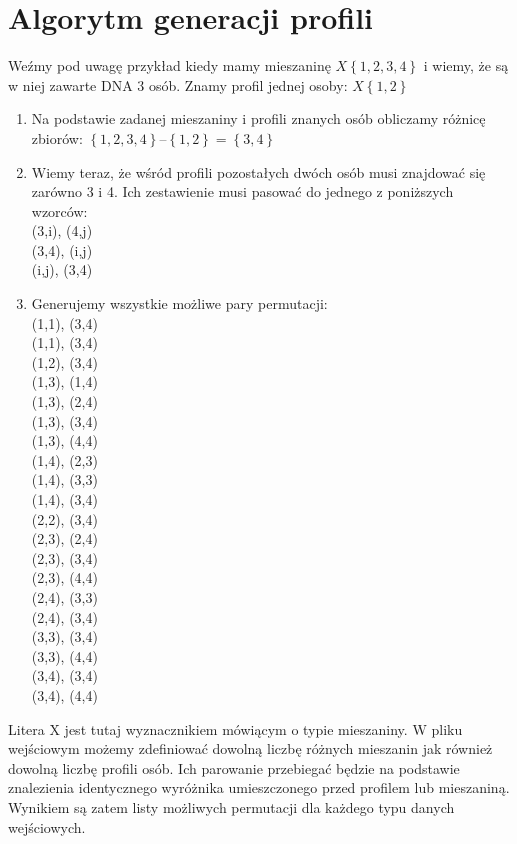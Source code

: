 \documentclass[11pt,a4paper]{article}
\begin{document}
\section{Algorytm generacji profili}
Weźmy pod uwagę przykład kiedy mamy mieszaninę $X\left\{1,2,3,4\right\}$ i wiemy, że są w niej zawarte DNA 3 osób. Znamy profil jednej osoby: $X\left\{1,2\right\}$
\begin{enumerate}
\item Na podstawie zadanej mieszaniny i profili znanych osób obliczamy różnicę zbiorów:
$\left\{1,2,3,4\right\} – \left\{1,2\right\} = \left\{3,4\right\}$
\item Wiemy teraz, że wśród profili pozostałych dwóch osób musi znajdować się zarówno 3 i 4. Ich zestawienie musi pasować do jednego z poniższych wzorców: \\
(3,i), (4,j) \\
(3,4), (i,j) \\
(i,j), (3,4) \\

\item Generujemy wszystkie możliwe pary permutacji: \\
(1,1), (3,4) \\
(1,1), (3,4) \\
(1,2), (3,4) \\
(1,3), (1,4)  \\
(1,3), (2,4) \\
(1,3), (3,4) \\
(1,3), (4,4)  \\
(1,4), (2,3) \\
(1,4), (3,3) \\
(1,4), (3,4)  \\
(2,2), (3,4) \\
(2,3), (2,4)  \\
(2,3), (3,4)  \\
(2,3), (4,4) \\
(2,4), (3,3) \\
(2,4), (3,4)  \\
(3,3), (3,4) \\
(3,3), (4,4)  \\
(3,4), (3,4) \\
(3,4), (4,4) \\
\end{enumerate}

Litera X jest tutaj wyznacznikiem mówiącym o typie mieszaniny. W pliku wejściowym możemy zdefiniować dowolną liczbę różnych mieszanin jak również dowolną liczbę profili osób. Ich parowanie przebiegać będzie na podstawie znalezienia identycznego wyróżnika umieszczonego przed profilem lub mieszaniną. Wynikiem są zatem listy możliwych permutacji dla każdego typu danych wejściowych.
\end{document}
